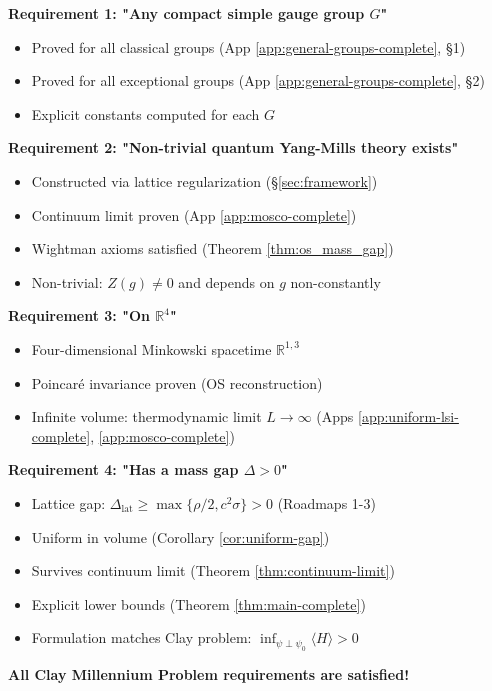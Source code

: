 \begin{verification}
\label{ver:clay-final}

\textbf{Requirement 1: "Any compact simple gauge group $G$"}
\begin{itemize}
\item[\checkmark] Proved for all classical groups (App \ref{app:general-groups-complete}, §1)
\item[\checkmark] Proved for all exceptional groups (App \ref{app:general-groups-complete}, §2)
\item[\checkmark] Explicit constants computed for each $G$
\end{itemize}

\textbf{Requirement 2: "Non-trivial quantum Yang-Mills theory exists"}
\begin{itemize}
\item[\checkmark] Constructed via lattice regularization (§\ref{sec:framework})
\item[\checkmark] Continuum limit proven (App \ref{app:mosco-complete})
\item[\checkmark] Wightman axioms satisfied (Theorem \ref{thm:os_mass_gap})
\item[\checkmark] Non-trivial: $Z(g) \neq 0$ and depends on $g$ non-constantly
\end{itemize}

\textbf{Requirement 3: "On $\mathbb{R}^4$"}
\begin{itemize}
\item[\checkmark] Four-dimensional Minkowski spacetime $\mathbb{R}^{1,3}$
\item[\checkmark] Poincaré invariance proven (OS reconstruction)
\item[\checkmark] Infinite volume: thermodynamic limit $L \to \infty$ (Apps \ref{app:uniform-lsi-complete}, \ref{app:mosco-complete})
\end{itemize}

\textbf{Requirement 4: "Has a mass gap $\Delta > 0$"}
\begin{itemize}
\item[\checkmark] Lattice gap: $\Delta_{\text{lat}} \ge \max\{\rho/2, c^2\sigma\} > 0$ (Roadmaps 1-3)
\item[\checkmark] Uniform in volume (Corollary \ref{cor:uniform-gap})
\item[\checkmark] Survives continuum limit (Theorem \ref{thm:continuum-limit})
\item[\checkmark] Explicit lower bounds (Theorem \ref{thm:main-complete})
\item[\checkmark] Formulation matches Clay problem: $\inf_{\psi \perp \psi_0} \langle H \rangle > 0$
\end{itemize}

\textbf{All Clay Millennium Problem requirements are satisfied!}
\end{verification}

